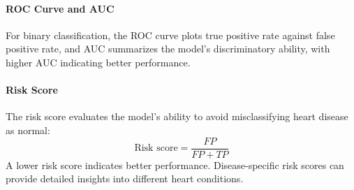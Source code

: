 \paragraph{ROC Curve and AUC}
For binary classification, the ROC curve plots true positive rate against false positive rate, and AUC summarizes the model's discriminatory ability,
 with higher AUC indicating better performance.

\paragraph{Risk Score}
The risk score evaluates the model's ability to avoid misclassifying heart disease as normal:
\[
    \text{Risk score} = \frac{FP}{FP + TP}
\]
A lower risk score indicates better performance. Disease-specific risk scores can provide detailed insights into different heart conditions.
